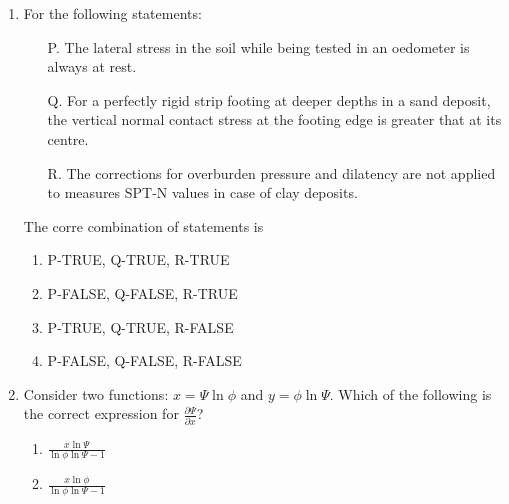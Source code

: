 \documentclass[journal,12pt,onecolumn]{IEEEtran}
\theoremstyle{remark}
\begin{document}
\begin{enumerate}
        \hfill{}
        \begin{multicols}{4}
            \begin{enumerate}
                \item 0.002
                    \columnbreak
                \item 0.017
                    \columnbreak
                \item 0.033
                    \columnbreak
                \item 0.050
            \end{enumerate}
        \end{multicols}
    \item For the following statements:
        \begin{enumerate}
            \item[P.] The lateral stress in the soil while being tested in an oedometer is always at rest. 
            \item[Q.] For a perfectly rigid strip footing at deeper depths in a sand deposit, the vertical
                normal contact stress at the footing edge is greater that at its centre.
            \item[R.] The corrections for overburden pressure and dilatency are not applied to measures 
                SPT-N values in case of clay deposits.
        \end{enumerate}
        The corre combination of statements is
        \hfill{}
            \begin{enumerate}
                \item P-TRUE, Q-TRUE, R-TRUE
                \item P-FALSE, Q-FALSE, R-TRUE
                \item P-TRUE, Q-TRUE, R-FALSE
                \item P-FALSE, Q-FALSE, R-FALSE
            \end{enumerate}
    \item Consider two functions: $x = \Psi \ln\phi$ and $y = \phi \ln\Psi$. Which of the following
        is the correct expression for $\frac{\partial \Psi}{\partial x}$?
        \hfill{}
        \begin{multicols}{4}
            \begin{enumerate}
                \item $\frac{x \ln \Psi}{\ln\phi\ln\Psi - 1}$
                    \columnbreak
                \item $\frac{x \ln \phi}{\ln\phi\ln\Psi - 1}$

\end{enumerate}
\end{multicols}
\end{enumerate}
\end{document}
